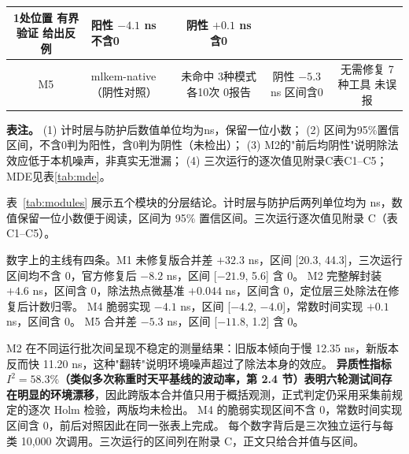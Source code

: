 \begin{table}[H]
{\begin{tabularx}{\textwidth}{|c|X|c|c|c|}
{1处位置\newline
有界验证\newline
给出反例} &
{\scriptsize
\textbf{阳性}\newline
$-4.1$ ns\newline
[$-4.2$, $-4.0$]\newline
不含0} &
{\scriptsize
\textbf{阴性}\newline
$+0.1$ ns\newline
[$-0.4$, 0.5]\newline
含0} \\
\hline
M5 &
mlkem-native\newline
{\scriptsize（阴性对照）} &
{\scriptsize
未命中\newline
3种模式\newline
各10次\newline
0报告} &
{\scriptsize
阴性\newline
$-5.3$ ns\newline
[$-11.8$, 1.2]\newline
区间含0} &
{\scriptsize
无需修复\newline
7种工具\newline
未误报} \\
\hline
\end{tabularx}
}
\par\smallskip
{\scriptsize
\textbf{表注。}
(1) 计时层与防护后数值单位均为ns，保留一位小数；
(2) 区间为95\%置信区间，不含0判为阳性，含0判为阴性（未检出）；
(3) M2的"前后均阴性"说明除法效应低于本机噪声，非真实无泄漏；
(4) 三次运行的逐次值见附录C表C1--C5；MDE见表\ref{tab:mde}。
}
\end{table}

表~\ref{tab:modules} 展示五个模块的分层结论。计时层与防护后两列单位均为 ns，数值保留一位小数便于阅读，区间为 95\% 置信区间。三次运行逐次值见附录 C（表 C1--C5）。

数字上的主线有四条。M1 未修复版合并差 $+32.3$ ns，区间 [20.3, 44.3]，三次运行区间均不含 0，官方修复后 $-8.2$ ns，区间 [$-21.9$, 5.6] 含 0。%
M2 完整解封装 $+4.6$ ns，区间含 0，除法热点微基准 $+0.044$ ns，区间含 0，定位层三处除法在修复后计数归零。%
M4 脆弱实现 $-4.1$ ns，区间 [$-4.2$, $-4.0$]，常数时间实现 $+0.1$ ns，区间含 0。%
M5 合并差 $-5.3$ ns，区间 [$-11.8$, 1.2] 含 0。%

M2 在不同运行批次间呈现不稳定的测量结果：旧版本倾向于慢 12.35 ns，新版本反而快 11.20 ns，这种"翻转"说明环境噪声超过了除法本身的效应。
\textbf{异质性指标 $I^2=58.3\%$（类似多次称重时天平基线的波动率，第 2.4 节）表明六轮测试间存在明显的环境漂移}，因此跨版本合并值只用于概括观测，正式判定仍采用采集前规定的逐次 Holm 检验，两版均未检出。%
M4 的脆弱实现区间不含 0，常数时间实现区间含 0，前后对照因此在同一张表上完成。%
每个数字背后是三次独立运行与每类 10,000 次调用。三次运行的区间列在附录 C，正文只给合并值与区间。

